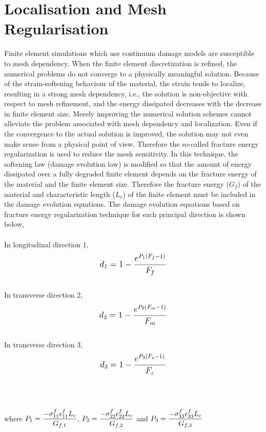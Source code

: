 \documentclass[12pt]{report}
\begin{document}
\section{Localisation and Mesh Regularisation}\label{Mesh Regularisation}
\indent\indent\indent Finite element simulations which use continuum damage models are susceptible to mesh dependency. When the finite element discretization is refined, the numerical problems do not converge to a physically meaningful solution. Because of the strain-softening behaviour of the material, the strain tends to localize, resulting in a strong mesh dependency, i.e., the solution is non-objective with respect to mesh refinement, and the energy dissipated decreases with the decrease in finite element size. Merely improving the numerical solution schemes cannot alleviate the problem associated with mesh dependency and localization. Even if the convergence to the actual solution is improved, the solution may not even make sense from a physical point of view. Therefore the so-called fracture energy regularization is used to reduce the mesh sensitivity. In this technique, the softening law (damage evolution law) is modified so that the amount of energy dissipated over a fully degraded finite element depends on the fracture energy of the material and the finite element size. Therefore the fracture energy ($G_f$) of the material and characteristic length ($L_{c}$) of the finite element must be included in the damage evolution equations. The damage evolution equations based on fracture energy regularization technique for each principal direction is shown below, \\
\\
In longitudinal direction 1,
\begin{equation}
\label{d1}
\mathlarger{d_{1} = 1 - \frac{e^{P_{1}(F_{f} - 1)}}{F_{f}}}
\end{equation}
\\
In transverse direction 2,
\begin{equation}
\label{d2}  
\mathlarger{d_{2} = 1 - \frac{e^{P_{2}(F_{m} - 1)}}{F_{m}}}
\end{equation}
\\
In transverse direction 3,
\begin{equation}
\label{d3} 
\mathlarger{d_{3} = 1 - \frac{e^{P_{3}(F_{z} - 1)}}{F_{z}}}
\end{equation}
\\
\\
\\
where $\mathlarger{P_{1} = \frac{-\sigma_{11}^{f}\epsilon_{11}^{f}L_{c}}{G_{f,1}}}$, $\mathlarger{P_{2} = \frac{-\sigma_{22}^{f}\epsilon_{22}^{f}L_{c}}{G_{f,2}}}$ and $\mathlarger{P_{3} = \frac{-\sigma_{33}^{f}\epsilon_{33}^{f}L_{c}}{G_{f,3}}}$ 
\end{document}
